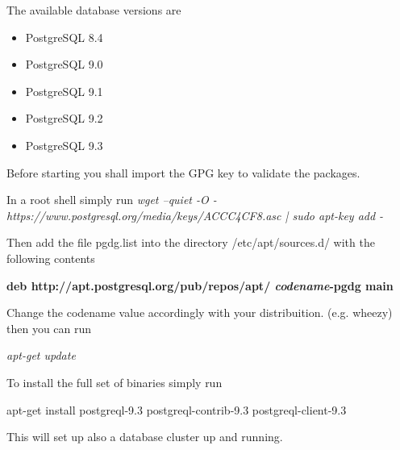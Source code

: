 The available database versions are
\begin{itemize}
 \item PostgreSQL 8.4 
 \item PostgreSQL 9.0 
 \item PostgreSQL 9.1 
 \item PostgreSQL 9.2 
 \item PostgreSQL 9.3
\end{itemize}

Before starting you shall import the GPG key to validate the packages.

In a root shell simply run
\textit{wget --quiet -O - https://www.postgresql.org/media/keys/ACCC4CF8.asc | sudo apt-key add -}

Then add the file pgdg.list into the directory /etc/apt/sources.d/ with the following contents

\textbf{deb http://apt.postgresql.org/pub/repos/apt/ \textit{codename}-pgdg main}

Change the codename value accordingly with your distribuition. (e.g. wheezy) then you can run

\textit{apt-get update}

To install the full set of binaries simply run

apt-get install postgreql-9.3 postgreql-contrib-9.3 postgreql-client-9.3 

This will set up also a database cluster up and running.


